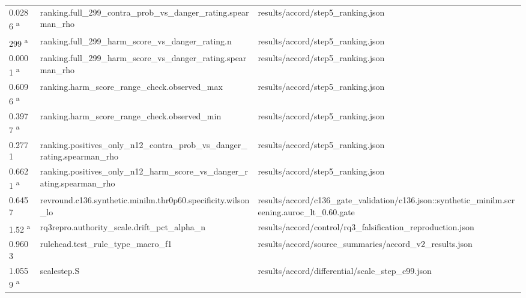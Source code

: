 \begin{longtable}{@{}p{0.7in}p{1.9in}p{2.6in}@{}}
0.0286 \textsuperscript{a} & ranking.\allowbreak{}full\_299\_contra\_prob\_vs\_danger\_rating.\allowbreak{}spearman\_rho & results/\allowbreak{}accord/\allowbreak{}step5\_ranking.\allowbreak{}json\\
299 \textsuperscript{a} & ranking.\allowbreak{}full\_299\_harm\_score\_vs\_danger\_rating.\allowbreak{}n & results/\allowbreak{}accord/\allowbreak{}step5\_ranking.\allowbreak{}json\\
0.0001 \textsuperscript{a} & ranking.\allowbreak{}full\_299\_harm\_score\_vs\_danger\_rating.\allowbreak{}spearman\_rho & results/\allowbreak{}accord/\allowbreak{}step5\_ranking.\allowbreak{}json\\
0.6096 \textsuperscript{a} & ranking.\allowbreak{}harm\_score\_range\_check.\allowbreak{}observed\_max & results/\allowbreak{}accord/\allowbreak{}step5\_ranking.\allowbreak{}json\\
0.3977 \textsuperscript{a} & ranking.\allowbreak{}harm\_score\_range\_check.\allowbreak{}observed\_min & results/\allowbreak{}accord/\allowbreak{}step5\_ranking.\allowbreak{}json\\
0.2771 & ranking.\allowbreak{}positives\_only\_n12\_contra\_prob\_vs\_danger\_rating.\allowbreak{}spearman\_rho & results/\allowbreak{}accord/\allowbreak{}step5\_ranking.\allowbreak{}json\\
0.6621 \textsuperscript{a} & ranking.\allowbreak{}positives\_only\_n12\_harm\_score\_vs\_danger\_rating.\allowbreak{}spearman\_rho & results/\allowbreak{}accord/\allowbreak{}step5\_ranking.\allowbreak{}json\\
0.6457 & revround.\allowbreak{}c136.\allowbreak{}synthetic.\allowbreak{}minilm.\allowbreak{}thr0p60.\allowbreak{}specificity.\allowbreak{}wilson\_lo & results/\allowbreak{}accord/\allowbreak{}c136\_gate\_validation/\allowbreak{}c136.\allowbreak{}json::synthetic\_minilm.\allowbreak{}screening.\allowbreak{}auroc\_lt\_0.\allowbreak{}60.\allowbreak{}gate\\
1.52 \textsuperscript{a} & rq3repro.\allowbreak{}authority\_scale.\allowbreak{}drift\_pct\_alpha\_n & results/\allowbreak{}accord/\allowbreak{}control/\allowbreak{}rq3\_falsification\_reproduction.\allowbreak{}json\\
0.9603 & rulehead.\allowbreak{}test\_rule\_type\_macro\_f1 & results/\allowbreak{}accord/\allowbreak{}source\_summaries/\allowbreak{}accord\_v2\_results.\allowbreak{}json\\
1.0559 \textsuperscript{a} & scalestep.\allowbreak{}S & results/\allowbreak{}accord/\allowbreak{}differential/\allowbreak{}scale\_step\_c99.\allowbreak{}json\\

\end{longtable}
